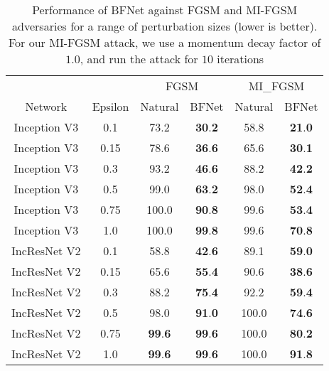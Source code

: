 \documentclass{article} %
\begin{document}
\begin{table}[htb]
\begin{center}
\begin{tabular}{cccccc} \toprule
& & \multicolumn{2}{c}{FGSM} & \multicolumn{2}{c}{MI\_FGSM} \\
      {Network} & {Epsilon} & {Natural} & {BFNet} & Natural & BFNet \\ \midrule{Inception V3}  & 0.1  & 73.2  &  \textbf{30}.\textbf{2} & 58.8  &  \textbf{21}.\textbf{0}\\{Inception V3}  & 0.15 & 78.6  &  \textbf{36}.\textbf{6} & 65.6  &  \textbf{30}.\textbf{1} \\
	  {Inception V3}  & 0.3  & 93.2  &  \textbf{46}.\textbf{6} &88.2  &  \textbf{42}.\textbf{2}\\{Inception V3}  & 0.5  & 99.0  &  \textbf{63}.\textbf{2}& 98.0  &  \textbf{52}.\textbf{4} \\
	  {Inception V3}  & 0.75 & 100.0 &  \textbf{90}.\textbf{8} & 99.6  &  \textbf{53}.\textbf{4}   \\
	  {Inception V3}  & 1.0  & 100.0 &  \textbf{99}.\textbf{8} &99.6  &  \textbf{70}.\textbf{8}\\
	  \noalign{\smallskip\hrule\medskip}
      {IncResNet V2}  & 0.1  & 58.8  &  \textbf{42}.\textbf{6} &89.1  &  \textbf{59}.\textbf{0}\\{IncResNet V2}  & 0.15 & 65.6  &  \textbf{55}.\textbf{4} &90.6  &  \textbf{38}.\textbf{6}\\{IncResNet V2}  & 0.3  & 88.2  &  \textbf{75}.\textbf{4} &92.2  &  \textbf{59}.\textbf{4}\\{IncResNet V2}  & 0.5  & 98.0  &  \textbf{91}.\textbf{0} &100.0 &  \textbf{74}.\textbf{6}\\{IncResNet V2}  & 0.75 & \textbf{99}.\textbf{6}  &  \textbf{99}.\textbf{6} &100.0 &  \textbf{80}.\textbf{2} \\
      {IncResNet V2}  & 1.0  & \textbf{99}.\textbf{6}  &  \textbf{99}.\textbf{6} & 100.0 &  \textbf{91}.\textbf{8}\\ \bottomrule
\end{tabular}
\end{center}
\vskip -0.1in
\caption{ Performance of BFNet against FGSM and MI-FGSM adversaries for a range of perturbation sizes (lower is better). For our MI-FGSM attack, we use a momentum decay factor of $1.0$, and run the attack for $10$ iterations} \label{tab:fgsm_in}
\vskip -0.1in
\end{table}
\end{document}
